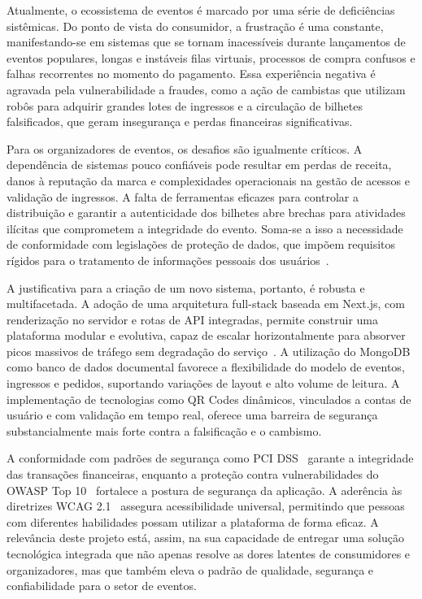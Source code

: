 Atualmente, o ecossistema de eventos é marcado por uma série de deficiências sistêmicas. Do ponto de vista do consumidor, a frustração é uma constante, manifestando-se em sistemas que se tornam inacessíveis durante lançamentos de eventos populares, longas e instáveis filas virtuais, processos de compra confusos e falhas recorrentes no momento do pagamento. Essa experiência negativa é agravada pela vulnerabilidade a fraudes, como a ação de cambistas que utilizam robôs para adquirir grandes lotes de ingressos e a circulação de bilhetes falsificados, que geram insegurança e perdas financeiras significativas.

Para os organizadores de eventos, os desafios são igualmente críticos. A dependência de sistemas pouco confiáveis pode resultar em perdas de receita, danos à reputação da marca e complexidades operacionais na gestão de acessos e validação de ingressos. A falta de ferramentas eficazes para controlar a distribuição e garantir a autenticidade dos bilhetes abre brechas para atividades ilícitas que comprometem a integridade do evento. Soma-se a isso a necessidade de conformidade com legislações de proteção de dados, que impõem requisitos rígidos para o tratamento de informações pessoais dos usuários~\cite{LGPD:2018}.

A justificativa para a criação de um novo sistema, portanto, é robusta e multifacetada. A adoção de uma arquitetura full-stack baseada em Next.js, com renderização no servidor e rotas de API integradas, permite construir uma plataforma modular e evolutiva, capaz de escalar horizontalmente para absorver picos massivos de tráfego sem degradação do serviço~\cite{Pressman:2019}. A utilização do MongoDB como banco de dados documental favorece a flexibilidade do modelo de eventos, ingressos e pedidos, suportando variações de layout e alto volume de leitura. A implementação de tecnologias como QR Codes dinâmicos, vinculados a contas de usuário e com validação em tempo real, oferece uma barreira de segurança substancialmente mais forte contra a falsificação e o cambismo.

A conformidade com padrões de segurança como PCI DSS~\cite{PCIDSS:2022} garante a integridade das transações financeiras, enquanto a proteção contra vulnerabilidades do OWASP Top 10~\cite{OWASP:2021} fortalece a postura de segurança da aplicação. A aderência às diretrizes WCAG 2.1~\cite{WCAG:2018} assegura acessibilidade universal, permitindo que pessoas com diferentes habilidades possam utilizar a plataforma de forma eficaz. A relevância deste projeto está, assim, na sua capacidade de entregar uma solução tecnológica integrada que não apenas resolve as dores latentes de consumidores e organizadores, mas que também eleva o padrão de qualidade, segurança e confiabilidade para o setor de eventos.

